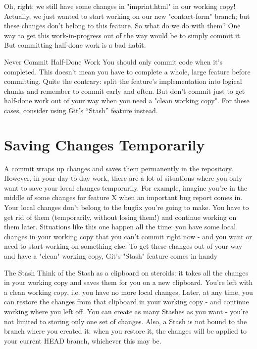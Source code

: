 \documentclass{article}
\begin{document}
Oh, right: we still have some changes in "imprint.html" in our working copy! Actually, we just wanted to start working on our new "contact-form" branch; but these changes don't belong to this feature. So what do we do with them? One way to get this work-in-progress out of the way would be to simply commit it. But committing half-done work is a bad habit.

\begin{golden-rule}Never Commit Half-Done Work
\newline\newline
You should only commit code when it’s completed. This doesn’t mean you have to complete a whole, large feature before committing. Quite the contrary: split the feature’s implementation into logical chunks and remember to commit early and often. But don’t commit just to get half-done work out of your way when you need a "clean working copy". For these cases, consider using Git’s “Stash” feature instead.
\end{golden-rule}

\section{Saving Changes Temporarily}
A commit wraps up changes and saves them permanently in the repository. However, in your day-to-day work, there are a lot of situations where you only want to save your local changes temporarily. For example, imagine you're in the middle of some changes for feature X when an important bug report comes in. Your local changes don't belong to the bugfix you're going to make. You have to get rid of them (temporarily, without losing them!) and continue working on them later.
\newline\newline
Situations like this one happen all the time: you have some local changes in your working copy that you can't commit right now - and you want or need to start working on something else. To get these changes out of your way and have a "clean" working copy, Git's "Stash" feature comes in handy

\begin{concept}
The Stash
\newline\newline 
Think of the Stash as a clipboard on steroids: it takes all the changes in your working copy and saves them for you on a new clipboard. You're left with a clean working copy, i.e. you have no more local changes.
\newline\newline 
Later, at any time, you can restore the changes from that clipboard in your working copy - and continue working where you left off.
\newline\newline 
You can create as many Stashes as you want - you're not limited to storing only one set of changes. Also, a Stash is not bound to the branch where you created it: when you restore it, the changes will be applied to your current HEAD branch, whichever this may be.
\end{concept}
\end{document}
